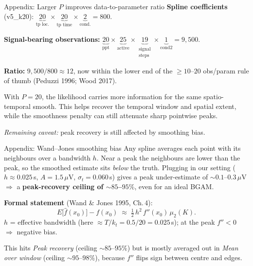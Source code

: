 \documentclass{beamer}
\begin{document}
\begin{frame}{Appendix: Larger $P$ improves data-to-parameter ratio}
\footnotesize
\textbf{Spline coefficients} (v5\_k20):
\quad
$\underbrace{20}_{\text{tp loc.}} \times \underbrace{20}_{\text{tp time}} \times \underbrace{2}_{\text{cond.}} = 800.$

\smallskip
\textbf{Signal-bearing observations:}
\quad
$\underbrace{20}_{\text{ppt}} \times \underbrace{25}_{\text{active}} \times \underbrace{19}_{\substack{\text{signal}\\\text{steps}}} \times \underbrace{1}_{\text{cond2}} = 9{,}500.$

\smallskip
\textbf{Ratio:} $9{,}500 / 800 \approx 12$, now within the lower end of the
$\geq 10$--$20$ obs/param rule of thumb (Peduzzi 1996; Wood 2017).

\medskip
With $P=20$, the likelihood carries more information for the same
spatio-temporal smooth. This helps recover the temporal window and spatial
extent, while the smoothness penalty can still attenuate sharp pointwise peaks.

\smallskip
\textit{Remaining caveat:} peak recovery is still affected by smoothing bias.
\end{frame}

\begin{frame}{Appendix: Wand--Jones smoothing bias}
\small
Any spline averages each point with its
neighbours over a bandwidth $h$. Near a peak the neighbours
are lower than the peak, so the smoothed estimate sits
\emph{below} the truth. Plugging in our setting ($h \approx 0.025$\,s,
$A = 1.5\,\mu$V, $\sigma_t = 0.060$\,s) gives a peak under-estimate
of $\sim 0.1$--$0.3\,\mu$V $\Rightarrow$ a \textbf{peak-recovery
ceiling of $\sim 85$--$95\%$}, even for an ideal BGAM.

\medskip
\textbf{Formal statement} (Wand \& Jones 1995, Ch.\,4):
\[
E\bigl[\hat f(x_0)\bigr] - f(x_0)
\;\approx\;
\tfrac{1}{2}\, h^2 \, f''(x_0) \, \mu_2(K).
\]
$h$ = effective bandwidth (here $\approx T/k_t = 0.5/20 = 0.025$\,s);
at the peak $f'' < 0$ $\Rightarrow$ negative bias.

\medskip
This hits \emph{Peak recovery} (ceiling $\sim 85$--$95\%$) but is
mostly averaged out in \emph{Mean over window} (ceiling $\sim 95$--$98\%$),
because $f''$ flips sign between centre and edges.
\end{frame}
\end{document}
